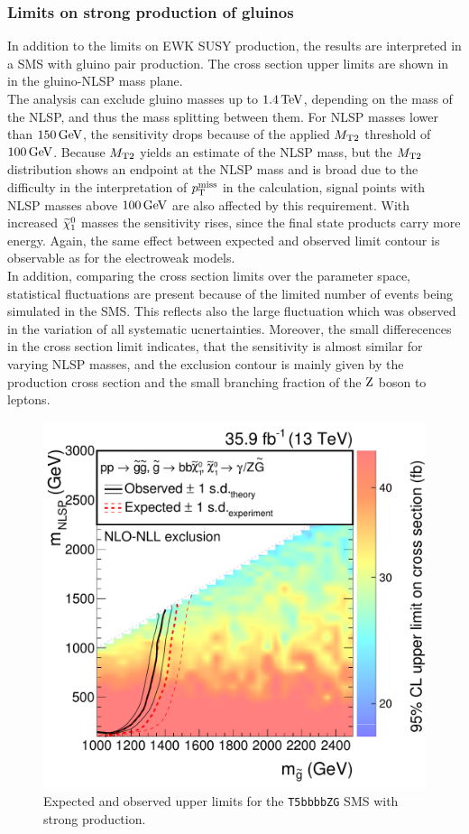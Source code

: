 \subsubsection*{Limits on strong production of gluinos}
In addition to the limits on EWK SUSY production, the results are interpreted in a SMS with gluino pair production. The cross section upper limits are shown in  in the gluino-NLSP mass plane.\\
The analysis can exclude gluino masses up to $1.4\,\text{Te\hspace{-.08em}V}$, depending on the mass of the NLSP, and thus the mass splitting between them. For NLSP masses lower than $150\,\text{Ge\hspace{-.08em}V}$, the sensitivity drops because of the applied $M_{\mathrm{T2}}$ threshold of $100\,\text{Ge\hspace{-.08em}V}$. Because $M_{\mathrm{T2}}$ yields an estimate of the NLSP mass, but the $M_{\mathrm{T2}}$ distribution shows an endpoint at the NLSP mass and is broad due to the difficulty in the interpretation of $p_{\mathrm{T}}^\text{miss}$ in the calculation, signal points with NLSP masses above $100\,\text{Ge\hspace{-.08em}V}$ are also affected by this requirement. With increased $\widetilde{\chi}^{0}_{1}$ masses the sensitivity rises, since the final state products carry more energy. Again, the same effect between expected and observed limit contour is observable as for the electroweak models.\\
In addition, comparing the cross section limits over the parameter space, statistical fluctuations are present because of the limited number of events being simulated in the SMS. This reflects also the large fluctuation which was observed in the variation of all systematic ucnertainties. Moreover, the small differecences in the cross section limit indicates, that the sensitivity is almost similar for varying NLSP masses, and the exclusion contour is mainly given by the production cross section and the small branching fraction of the $\mathrm{Z}$ boson to leptons.

\begin{figure}[tbp]
 \centering
 \includegraphics[width=\pairwidth]{figures/EndorsementPlots/T5bbbbZg_limits_XSEC2}
 \caption{Expected and observed upper limits for the \texttt{T5bbbbZG} SMS with strong production.}
 \label{fig:limitStrong}
\end{figure}
